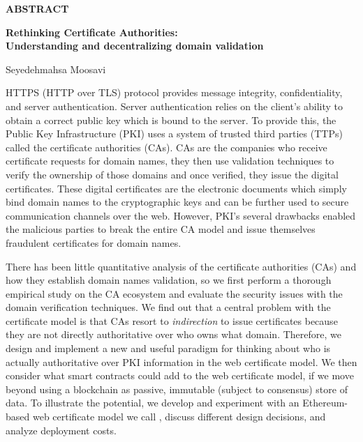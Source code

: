 
\vspace*{1cm}
\begin{center}
{\bf ABSTRACT}
\end{center}
\begin{center}
{\bf Rethinking Certificate Authorities: \\Understanding and decentralizing domain validation}
\end{center}
\vspace*{0.2in}
\begin{center}
Seyedehmahsa Moosavi
\end{center}

HTTPS (HTTP over TLS) protocol provides message integrity, confidentiality, and server authentication. Server authentication relies on the client's ability to obtain a correct public key which is bound to the server. To provide this, the Public Key Infrastructure (PKI) uses a system of trusted third parties (TTPs) called the certificate authorities (CAs). CAs are the companies who receive certificate requests for domain names, they then use validation techniques to verify the ownership of those domains and once verified, they issue the digital certificates. These digital certificates are the electronic documents which simply bind domain names to the cryptographic keys and can be further used to secure communication channels over the web. However, PKI's several drawbacks enabled the malicious parties to break the entire CA model and issue themselves fraudulent certificates for domain names.

There has been little quantitative analysis of the certificate authorities (CAs) and how they establish domain names validation, so we first perform a thorough empirical study on the CA ecosystem and evaluate the security issues with the domain verification techniques. We find out that a central problem with the certificate model is that CAs resort to \textit{indirection} to issue certificates because they are not directly authoritative over who owns what domain. Therefore, we design and implement a new and useful paradigm for thinking about who is actually authoritative over PKI information in the web certificate model. We then consider what smart contracts could add to the web certificate model, if we move beyond using a blockchain as passive, immutable (subject to consensus) store of data. To illustrate the potential, we develop and experiment with an Ethereum-based web certificate model we call \Ghazalstar, discuss different design decisions, and analyze deployment costs.


